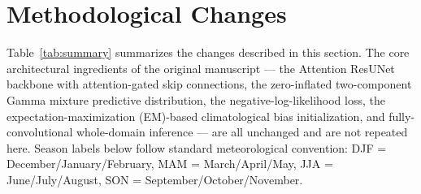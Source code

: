 \documentclass[11pt]{article}
\begin{document}
\section{Methodological Changes}
\label{sec:changes}

Table~\ref{tab:summary} summarizes the changes described in this
section. The core architectural ingredients of the original
manuscript --- the Attention ResUNet backbone with attention-gated skip
connections, the zero-inflated two-component Gamma mixture predictive
distribution, the negative-log-likelihood loss, the
expectation-maximization (EM)-based
climatological bias initialization, and fully-convolutional
whole-domain inference --- are all unchanged and are not repeated here.
Season labels below follow standard meteorological convention: DJF =
December/January/February, MAM = March/April/May, JJA =
June/July/August, SON = September/October/November.
\end{document}
